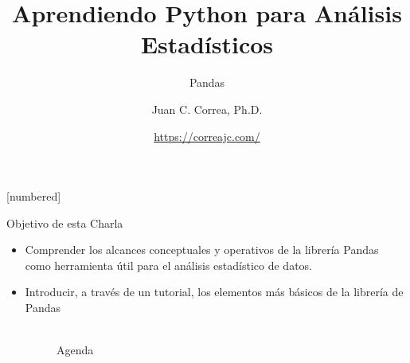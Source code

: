 \documentclass[aspectratio=169]{beamer}
\begin{document}





\author[Juan C. Correa, Ph.D.]{Juan C. Correa, Ph.D.}


\title[Python: Pandas]{Aprendiendo Python para Análisis Estadísticos}
\subtitle{Pandas}
[numbered]
\date[Junio 2021]{\textcolor{blue}{\url{https://correajc.com/}}}


\begin{frame}
	\titlepage
\end{frame}

\begin{frame}
\begin{block}{Objetivo de esta Charla}
\vspace{0.3cm}
\begin{itemize}
    \item Comprender los alcances conceptuales y operativos de la librería Pandas como herramienta útil para el análisis estadístico de datos.
    \item Introducir, a través de un tutorial, los elementos más básicos de la librería de Pandas
\end{itemize}

\end{block}
\end{frame}

\begin{frame}{~~~~~~~~~~~~~~~~~~~~~~~~~~~~~~~~~~~~~~~~~~~~~~~~~~~~~~~~~~~~~~~~~~~~~~~~~~~~~~~~~Agenda}
\tableofcontents
\end{frame}
\end{document}
